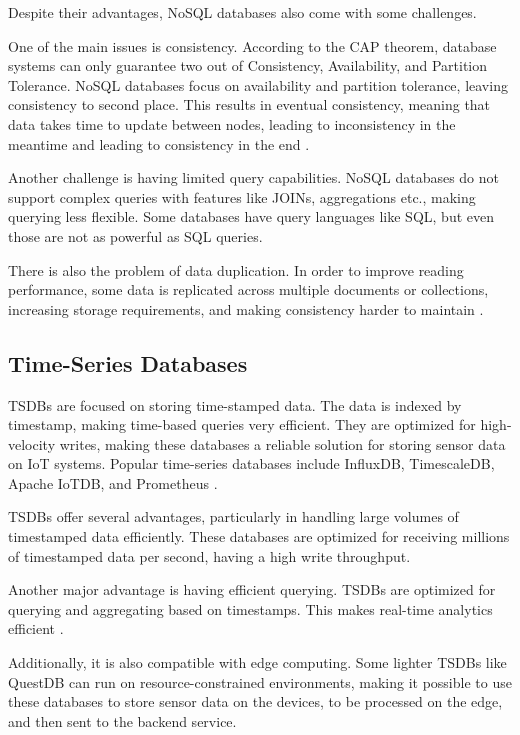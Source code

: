 Despite their advantages, \gls{NoSQL} databases also come with some challenges.

One of the main issues is consistency.
According to the \gls{CAP} theorem, database systems can only guarantee two out of
Consistency, Availability, and Partition Tolerance. \gls{NoSQL} databases focus on
availability and partition tolerance, leaving consistency to second place.
This results in eventual consistency, meaning that data takes time to update
between nodes, leading to inconsistency in the meantime and leading to
consistency in the end \cite{Yadav2024}.

Another challenge is having limited query capabilities.
\gls{NoSQL} databases do not support complex queries with features like JOINs,
aggregations etc., making querying less flexible. Some databases have query
languages like \gls{SQL}, but even those are not as powerful as \gls{SQL} queries.

There is also the problem of data duplication.
In order to improve reading performance, some data is replicated across
multiple documents or collections, increasing storage requirements, and
making consistency harder to maintain \cite{bdcc7020097}.
\subsection{Time-Series Databases}
\gls{TSDB}s are focused on storing time-stamped data. The
data is indexed by timestamp, making time-based queries very efficient. They are
optimized for high-velocity writes, making these databases a reliable solution
for storing sensor data on \gls{IoT} systems. Popular time-series databases include
InfluxDB, TimescaleDB, Apache IoTDB, and Prometheus \cite{wang2023apache, InfluxDB}.

\gls{TSDB}s offer several advantages, particularly in handling large volumes
of timestamped data efficiently. These databases are optimized for receiving
millions of timestamped data per second, having a high write throughput.

Another major advantage is having efficient querying. \gls{TSDB}s are optimized
for querying and aggregating based on timestamps. This makes real-time analytics
efficient \cite{InfluxDB}.

Additionally, it is also compatible with edge computing.
Some lighter \gls{TSDB}s like QuestDB can run on resource-constrained environments,
making it possible to use these databases to store sensor data on the devices,
to be processed on the edge, and then sent to the backend service.


